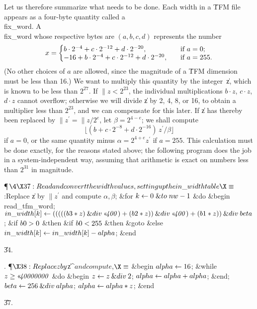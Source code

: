Let us therefore summarize what needs to be done. Each width in a \.{TFM}
file appears as a four-byte quantity called a \\{fix\_word}.  A \\{fix\_word}
whose respective bytes are $(a,b,c,d)$ represents the number
$$x=\left\{\vcenter{\halign{$#$,\hfil\qquad&if $#$\hfil\cr
b\cdot2^{-4}+c\cdot2^{-12}+d\cdot2^{-20}&a=0;\cr
-16+b\cdot2^{-4}+c\cdot2^{-12}+d\cdot2^{-20}&a=255.\cr}}\right.$$
(No other choices of $a$ are allowed, since the magnitude of a \.{TFM}
dimension must be less than 16.)  We want to multiply this quantity by the
integer~\|z, which is known to be less than $2^{27}$.
If $\|z<2^{23}$, the individual multiplications $b\cdot z$, $c\cdot z$,
$d\cdot z$ cannot overflow; otherwise we will divide \|z by 2, 4, 8, or
16, to obtain a multiplier less than $2^{23}$, and we can compensate for
this later. If \|z has thereby been replaced by $\|z^\prime=\|z/2^e$, let
$\beta=2^{4-e}$; we shall compute
$$\lfloor(b+c\cdot2^{-8}+d\cdot2^{-16})\,z^\prime/\beta\rfloor$$ if $a=0$,
or the same quantity minus $\alpha=2^{4+e}z^\prime$ if $a=255$.
This calculation must be
done exactly, for the reasons stated above; the following program does the
job in a system-independent way, assuming that arithmetic is exact on
numbers less than $2^{31}$ in magnitude.

\Y\P$\4\X37:Read and convert the width values, setting up the \\{in\_width}
table\X\S$\6
:Replace \|z by $\|z^\prime$ and compute $\alpha,\beta$\X;\6
\&{for} $\hbox{$k$}\gets0\mathrel{\&{to}}\\{nw}-1$ \1\&{do}\6
\&{begin} \\{read\_tfm\_word};\5
$\\{in\_width}[\|k]\K(((((\\{b3}\ast\|z)\mathbin{\&{div}}\O{400})+(\\{b2}\ast%
\|z))\mathbin{\&{div}}\O{400})+(\\{b1}\ast\|z))\mathbin{\&{div}}\\{beta}$;\6
\&{if} $\\{b0}>0$ \1\&{then}\6
\&{if} $\\{b0}<255$ \1\&{then}\5
\&{goto} \6
\4\&{else} $\\{in\_width}[\hbox{$k$}]\gets\\{in\_width}[\hbox{$k$}]-\\{alpha}$;\2\2\6
\&{end}\2\par
\U34.\fi

. \P$\X38:Replace \|z by $\|z^\prime$ and compute $\alpha,\beta$\X\S$\6
\&{begin} $\\{alpha}\gets16$;\6
\&{while} $\|z\G\O{40000000}$ \1\&{do}\6
\&{begin} $\hbox{$z$}\gets\hbox{$z$}\mathbin{\&{div}}2$;\5
$\\{alpha}\gets\\{alpha}+\\{alpha}$;\6
\&{end};\2\6
$\\{beta}\gets256\mathbin{\&{div}}\\{alpha}$;\5
$\\{alpha}\gets\\{alpha}\ast\hbox{$z$}$;\6
\&{end}\par
\U37.\fi

